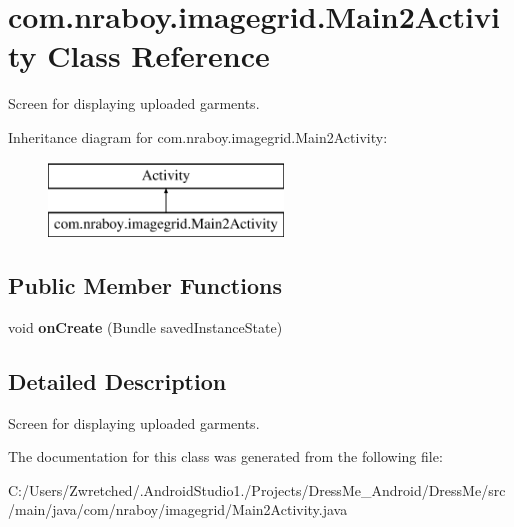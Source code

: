 \hypertarget{classcom_1_1nraboy_1_1imagegrid_1_1_main2_activity}{}\section{com.\+nraboy.\+imagegrid.\+Main2\+Activity Class Reference}
\label{classcom_1_1nraboy_1_1imagegrid_1_1_main2_activity}


Screen for displaying uploaded garments.  


Inheritance diagram for com.\+nraboy.\+imagegrid.\+Main2\+Activity\+:\begin{figure}[H]
\begin{center}
\leavevmode
\includegraphics[height=2.000000cm]{classcom_1_1nraboy_1_1imagegrid_1_1_main2_activity}
\end{center}
\end{figure}
\subsection*{Public Member Functions}
\begin{DoxyCompactItemize}
\item 
\hypertarget{classcom_1_1nraboy_1_1imagegrid_1_1_main2_activity_ac783af0f609459727ebf7d3eecc11d2f}{}void {\bfseries on\+Create} (Bundle saved\+Instance\+State)\label{classcom_1_1nraboy_1_1imagegrid_1_1_main2_activity_ac783af0f609459727ebf7d3eecc11d2f}

\end{DoxyCompactItemize}


\subsection{Detailed Description}
Screen for displaying uploaded garments. 

The documentation for this class was generated from the following file\+:\begin{DoxyCompactItemize}
\item 
C\+:/\+Users/\+Zwretched/.\+Android\+Studio1./\+Projects/\+Dress\+Me\+\_\+\+Android/\+Dress\+Me/src/main/java/com/nraboy/imagegrid/Main2\+Activity.\+java\end{DoxyCompactItemize}
